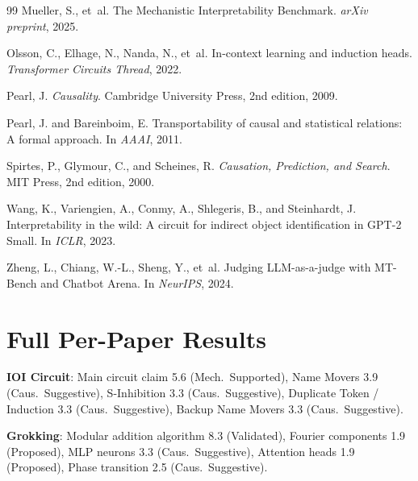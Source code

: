 \documentclass[10pt]{article}
\begin{document}
\begin{thebibliography}{99}
Mueller, S., et~al.
\newblock The Mechanistic Interpretability Benchmark.
\newblock \emph{arXiv preprint}, 2025.

Olsson, C., Elhage, N., Nanda, N., et~al.
\newblock In-context learning and induction heads.
\newblock \emph{Transformer Circuits Thread}, 2022.

Pearl, J.
\newblock \emph{Causality}.
\newblock Cambridge University Press, 2nd edition, 2009.

Pearl, J. and Bareinboim, E.
\newblock Transportability of causal and statistical relations: A formal approach.
\newblock In \emph{AAAI}, 2011.

Spirtes, P., Glymour, C., and Scheines, R.
\newblock \emph{Causation, Prediction, and Search}.
\newblock MIT Press, 2nd edition, 2000.

Wang, K., Variengien, A., Conmy, A., Shlegeris, B., and Steinhardt, J.
\newblock Interpretability in the wild: A circuit for indirect object identification in {GPT}-2 Small.
\newblock In \emph{ICLR}, 2023.

Zheng, L., Chiang, W.-L., Sheng, Y., et~al.
\newblock Judging {LLM}-as-a-judge with {MT}-Bench and Chatbot Arena.
\newblock In \emph{NeurIPS}, 2024.

\end{thebibliography}

\appendix

\section{Full Per-Paper Results}
\label{app:results}

\textbf{IOI Circuit}: Main circuit claim 5.6 (Mech.\ Supported), Name Movers 3.9 (Caus.\ Suggestive), S-Inhibition 3.3 (Caus.\ Suggestive), Duplicate Token / Induction 3.3 (Caus.\ Suggestive), Backup Name Movers 3.3 (Caus.\ Suggestive).

\textbf{Grokking}: Modular addition algorithm 8.3 (Validated), Fourier components 1.9 (Proposed), MLP neurons 3.3 (Caus.\ Suggestive), Attention heads 1.9 (Proposed), Phase transition 2.5 (Caus.\ Suggestive).
\end{document}
